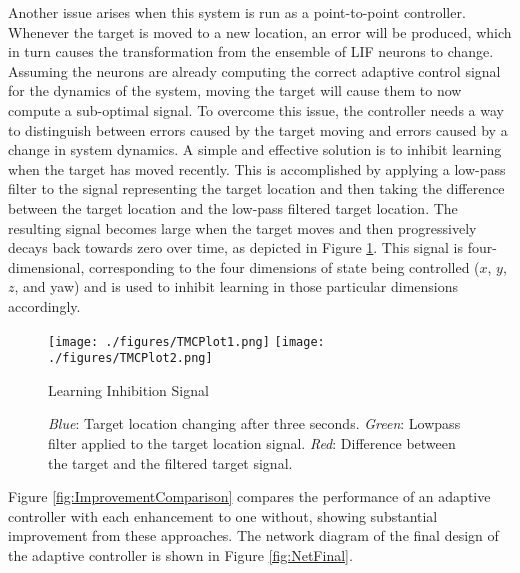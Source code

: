 \documentclass[letterpaper, 10 pt, conference]{ieeeconf}  %
\begin{document}
Another issue arises when this system is run as a point-to-point controller.
Whenever the target is moved to a new location, an error will be produced, which in turn causes the transformation from the ensemble of LIF neurons to change.
Assuming the neurons are already computing the correct adaptive control signal for the dynamics of the system, moving the target will cause them to now compute a sub-optimal signal.
To overcome this issue, the controller needs a way to distinguish between errors caused by the target moving and errors caused by a change in system dynamics.
A simple and effective solution is to inhibit learning when the target has moved recently.
This is accomplished by applying a low-pass filter to the signal representing the target location and then taking the difference between the target location and the low-pass filtered target location.
The resulting signal becomes large when the target moves and then progressively decays back towards zero over time, as depicted in Figure \ref{fig:TMCSignal}.
This signal is four-dimensional, corresponding to the four dimensions of state being controlled ($x$, $y$, $z$, and yaw) and is used to inhibit learning in those particular dimensions accordingly.

\begin{figure}
\centering
\texttt{[image: ./figures/TMCPlot1.png]}
\texttt{[image: ./figures/TMCPlot2.png]}
\caption{Learning Inhibition Signal}
\label{fig:TMCSignal}
\captionsetup{singlelinecheck=off,font=footnotesize}
\caption*{\textit{Blue}: Target location changing after three seconds. \textit{Green}: Lowpass filter applied to the target location signal. \textit{Red}: Difference between the target and the filtered target signal.}
\end{figure}

Figure \ref{fig:ImprovementComparison} compares the performance of an adaptive controller with each enhancement to one without, showing substantial improvement from these approaches.
The network diagram of the final design of the adaptive controller is shown in Figure \ref{fig:NetFinal}.
\end{document}
